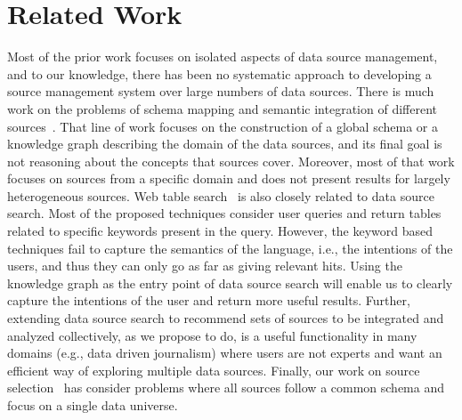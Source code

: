 \documentclass{sig-alternate}
\begin{document}
%
%
%


\section{Related Work}
\label{sec:related}
Most of the prior work focuses on isolated aspects of data source management, and to our knowledge, there has been no systematic approach to developing a source management system over large numbers of data sources. There is much work on the problems of schema mapping and semantic integration of different
sources~\cite{cafarella:2009,venetis:11,oktie:11, oktie:13}. That line of work focuses on the construction of a global schema or a knowledge graph describing the domain of the data sources, and its final goal is not reasoning about the concepts that sources cover. Moreover, most of that work focuses on sources from a specific domain and does not present results for largely heterogeneous sources. Web table search~\cite{cafarella:2009,limaye:2010, dassarma:2012,yakout:2012, fan:2014} is also closely related to data source search. Most of the proposed techniques consider user queries and return tables related to specific keywords present in the query. However, the keyword based techniques fail to capture the semantics of the language, i.e., the intentions of the users, and thus they can only go as far as giving relevant hits. Using the knowledge graph as the entry point of data source search will enable us to clearly capture the intentions of the user and return more useful results. Further, extending data source search to recommend sets of sources to be integrated and analyzed collectively, as we propose to do, is a useful functionality in many domains (e.g., data driven journalism) where users are not experts and want an efficient way of exploring multiple data sources.  Finally, our work on source selection~\cite{dong:vldb13, rekatsinas:2014} has consider problems where all sources follow a common schema and focus on a single data universe.
\end{document}
